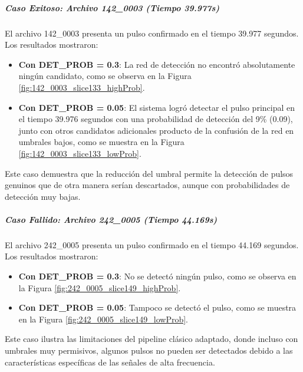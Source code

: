 \subparagraph{Caso Exitoso: Archivo 142\_0003 (Tiempo 39.977s)}

El archivo 142\_0003 presenta un pulso confirmado en el tiempo 39.977 segundos. Los resultados mostraron:

\begin{itemize}
    \item \textbf{Con DET\_PROB = 0.3}: La red de detección no encontró absolutamente ningún candidato, como se observa en la Figura \ref{fig:142_0003_slice133_highProb}.
    \item \textbf{Con DET\_PROB = 0.05}: El sistema logró detectar el pulso principal en el tiempo 39.976 segundos con una probabilidad de detección del 9\% (0.09), junto con otros candidatos adicionales producto de la confusión de la red en umbrales bajos, como se muestra en la Figura \ref{fig:142_0003_slice133_lowProb}.
\end{itemize}

Este caso demuestra que la reducción del umbral permite la detección de pulsos genuinos que de otra manera serían descartados, aunque con probabilidades de detección muy bajas.

\subparagraph{Caso Fallido: Archivo 242\_0005 (Tiempo 44.169s)}

El archivo 242\_0005 presenta un pulso confirmado en el tiempo 44.169 segundos. Los resultados mostraron:

\begin{itemize}
    \item \textbf{Con DET\_PROB = 0.3}: No se detectó ningún pulso, como se observa en la Figura \ref{fig:242_0005_slice149_highProb}.
    \item \textbf{Con DET\_PROB = 0.05}: Tampoco se detectó el pulso, como se muestra en la Figura \ref{fig:242_0005_slice149_lowProb}.
\end{itemize}

Este caso ilustra las limitaciones del pipeline clásico adaptado, donde incluso con umbrales muy permisivos, algunos pulsos no pueden ser detectados debido a las características específicas de las señales de alta frecuencia.

